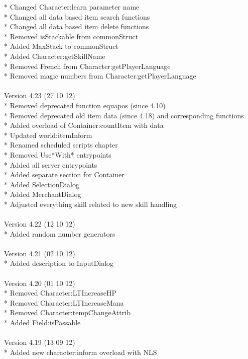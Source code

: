 \documentclass[a4paper,10pt,makeidx]{scrreprt}
\begin{document}
* Changed Character:learn parameter name\\
* Changed all data based item search functions\\
* Changed all data based item delete functions\\
* Removed isStackable from commonStruct\\
* Added MaxStack to commonStruct\\
* Added Character:getSkillName\\
* Removed French from Character:getPlayerLanguage\\
* Removed magic numbers from Character:getPlayerLanguage\\
\\
Version 4.23 (27 10 12)\\
* Removed deprecated function equapos (since 4.10)\\
* Removed deprecated old item data (since 4.18) and corresponding functions\\
* Added overload of Container:countItem with data\\
* Updated world:itemInform\\
* Renamed scheduled scripts chapter\\
* Removed Use*With* entrypoints\\
* Added all server entrypoints\\
* Added separate section for Container\\
* Added SelectionDialog\\
* Added MerchantDialog\\
* Adjusted everything skill related to new skill handling\\
\\
Version 4.22 (12 10 12)\\
* Added random number generators\\
\\
Version 4.21 (02 10 12)\\
* Added description to InputDialog\\
\\
Version 4.20 (01 10 12)\\
* Removed Character:LTIncreaseHP\\
* Removed Character:LTIncreaseMana\\
* Removed Character:tempChangeAttrib\\
* Added Field:isPassable\\
\\
Version 4.19 (13 09 12)\\
* Added new character:inform overload with NLS\\
\end{document}
